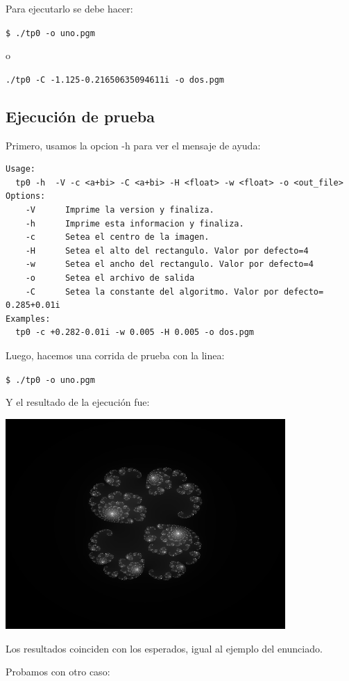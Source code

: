		 \bigskip
Para ejecutarlo se debe hacer:

\bigskip
\texttt{\$ ./tp0 -o uno.pgm }

\bigskip
o

\bigskip
\texttt{./tp0 -C -1.125-0.21650635094611i -o dos.pgm}

	
\subsection{Ejecución de prueba}
     Primero, usamos la opcion -h para ver el mensaje de ayuda:
     \begin{verbatim}
Usage:
  tp0 -h  -V -c <a+bi> -C <a+bi> -H <float> -w <float> -o <out_file>
Options:
    -V	    Imprime la version y finaliza.
    -h	    Imprime esta informacion y finaliza.
    -c	    Setea el centro de la imagen.
    -H	    Setea el alto del rectangulo. Valor por defecto=4
    -w	    Setea el ancho del rectangulo. Valor por defecto=4
    -o	    Setea el archivo de salida
    -C	    Setea la constante del algoritmo. Valor por defecto= 0.285+0.01i
Examples:
  tp0 -c +0.282-0.01i -w 0.005 -H 0.005 -o dos.pgm
 	     \end{verbatim}
	     
Luego, hacemos una corrida de prueba con la linea:

\bigskip
\bigskip
\texttt{\$  ./tp0 -o uno.pgm}

\bigskip
Y el resultado de la ejecución fue:

\bigskip
\includegraphics[width=0.8\textwidth,natwidth=610,natheight=642]{uno.png}

\bigskip
Los resultados coinciden con los esperados, igual al ejemplo del enunciado.

\bigskip 
\bigskip 
Probamos con otro caso:

